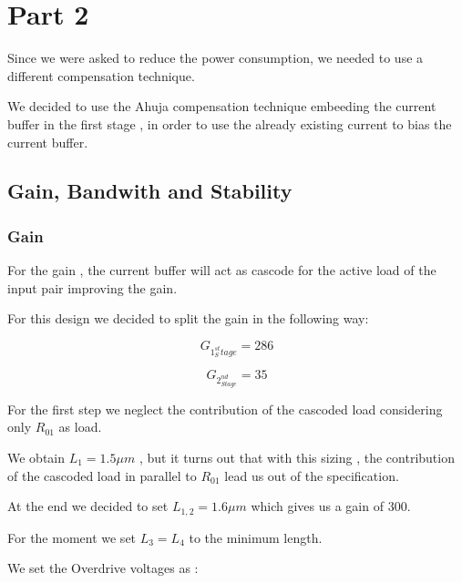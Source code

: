 \chapter{Part 2} %
\label{cha:part_2}

Since we were asked to reduce the power consumption, we needed to use a different compensation technique.

We decided to use the Ahuja compensation technique embeeding the current buffer in the first stage , in order to use the already existing current to bias the current buffer.

\section{Gain, Bandwith and Stability}

\subsection{Gain} %
\label{sec:gain}

For the gain , the current buffer will act as cascode for the active load of the input pair improving the gain.

For this design we decided to split the gain in the following way:

\begin{equation}
	G_{1^{st}_Stage}=286
\end{equation}

\begin{equation}
	G_{2^{nd}_{Stage}}=35
\end{equation}


For the first step we neglect the contribution of the cascoded load considering only $R_{01}$ as load.

We obtain $L_1=1.5 \mu m$ , but it turns out that with this sizing , the contribution of the cascoded load in parallel to $R_{01}$ lead us out of the specification.

At the end we decided to set $L_{1,2} = 1.6 \mu m$ which gives us a gain of 300.

For the moment we set $L_3=L_4$ to the minimum length.

We set the Overdrive voltages as :

